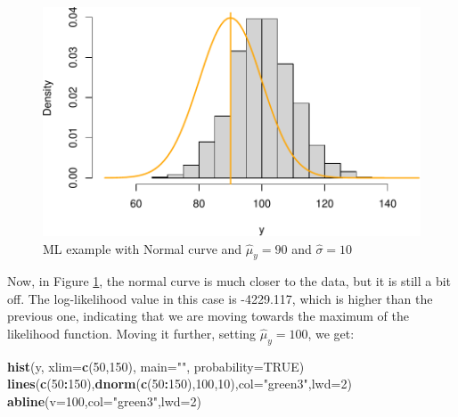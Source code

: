 \documentclass[
]{book}
\newenvironment{Shaded}{\begin{snugshade}}{\end{snugshade}}
\newcommand{\AttributeTok}[1]{\textcolor[rgb]{0.13,0.29,0.53}{#1}}
\newcommand{\ConstantTok}[1]{\textcolor[rgb]{0.56,0.35,0.01}{#1}}
\newcommand{\DecValTok}[1]{\textcolor[rgb]{0.00,0.00,0.81}{#1}}
\newcommand{\FunctionTok}[1]{\textcolor[rgb]{0.13,0.29,0.53}{\textbf{#1}}}
\newcommand{\NormalTok}[1]{#1}
\newcommand{\SpecialCharTok}[1]{\textcolor[rgb]{0.81,0.36,0.00}{\textbf{#1}}}
\newcommand{\StringTok}[1]{\textcolor[rgb]{0.31,0.60,0.02}{#1}}
\theoremstyle{definition}
\theoremstyle{definition}
\theoremstyle{definition}
\theoremstyle{definition}
\theoremstyle{remark}
\begin{document}
\begin{figure}
\centering
\includegraphics{Svetunkov---Statistics-for-Business-Analytics_files/figure-latex/MLENormalExample02-1.pdf}
\caption{\label{fig:MLENormalExample02}ML example with Normal curve and \(\hat{\mu}_y=90\) and \(\hat{\sigma}=10\)}
\end{figure}

Now, in Figure \ref{fig:MLENormalExample02}, the normal curve is much closer to the data, but it is still a bit off. The log-likelihood value in this case is -4229.117, which is higher than the previous one, indicating that we are moving towards the maximum of the likelihood function. Moving it further, setting \(\hat{\mu}_y=100\), we get:

\begin{Shaded}
\begin{Highlighting}[]
\FunctionTok{hist}\NormalTok{(y, }\AttributeTok{xlim=}\FunctionTok{c}\NormalTok{(}\DecValTok{50}\NormalTok{,}\DecValTok{150}\NormalTok{), }\AttributeTok{main=}\StringTok{""}\NormalTok{, }\AttributeTok{probability=}\ConstantTok{TRUE}\NormalTok{)}
\FunctionTok{lines}\NormalTok{(}\FunctionTok{c}\NormalTok{(}\DecValTok{50}\SpecialCharTok{:}\DecValTok{150}\NormalTok{),}\FunctionTok{dnorm}\NormalTok{(}\FunctionTok{c}\NormalTok{(}\DecValTok{50}\SpecialCharTok{:}\DecValTok{150}\NormalTok{),}\DecValTok{100}\NormalTok{,}\DecValTok{10}\NormalTok{),}\AttributeTok{col=}\StringTok{"green3"}\NormalTok{,}\AttributeTok{lwd=}\DecValTok{2}\NormalTok{)}
\FunctionTok{abline}\NormalTok{(}\AttributeTok{v=}\DecValTok{100}\NormalTok{,}\AttributeTok{col=}\StringTok{"green3"}\NormalTok{,}\AttributeTok{lwd=}\DecValTok{2}\NormalTok{)}
\end{Highlighting}
\end{Shaded}
\end{document}
